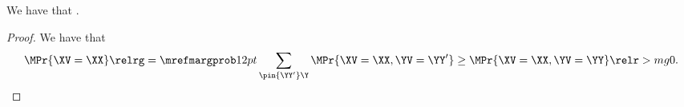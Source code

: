 \begin{proposition}
  \nrp
  We have that \marggimplprop.%
\end{proposition}

\begin{proof}
  \nrp
  We have that
  $$\MPr{\XV = \XX} \relrg = {\mrefmargprob} 12pt \sum_{\pin{\YY'}\Y} \MPr{\XV = \XX, \YV = \YY'} \ge \MPr{\XV = \XX, \YV = \YY} \relr > mg 0.$$%
\end{proof}
